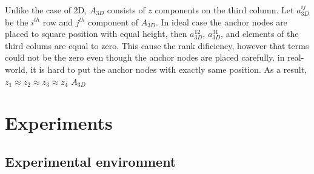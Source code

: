 \documentclass{ieeeaccess}
\begin{document}
Unlike the case of 2D, $A_{3D}$ consists of $z$ components on the third column. Let $a_{3D}^{ij}$ be the $i^{th}$ row and $j^{th}$ component of $A_{3D}$. In ideal case the anchor nodes are placed to square position with equal height, then $a_{3D}^{12}$, $a_{3D}^{31}$, and elements of the third colums are equal to zero. This cause the rank dificiency, however that terms could not be the zero even though the anchor nodes are placed carefully. in real-world, it is hard to put the anchor nodes with exactly same position. As a result, $z_1\approx z_2\approx z_3\approx z_4$ $A_{3D}$  



\section{Experiments}
\subsection{Experimental environment}
\end{document}
